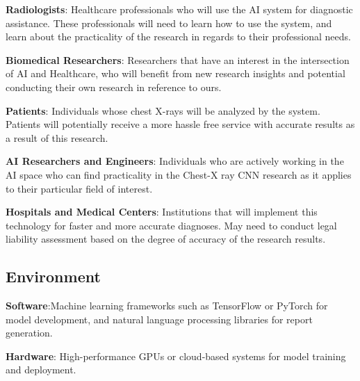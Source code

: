 \documentclass{article}
\begin{document}
\begin{itemize}
\begin{item}
    \textbf{Radiologists}: Healthcare professionals who will use the AI system for diagnostic assistance. These professionals will need to learn how to use the system, and learn about the practicality of the research in regards to their professional needs.
\end{item}
\begin{item}
    \textbf{Biomedical Researchers}: Researchers that have an interest in the intersection of AI and Healthcare, who will benefit from new research insights and potential conducting their own research in reference to ours.
\end{item}
\begin{item}
    \textbf{Patients}:  Individuals whose chest X-rays will be analyzed by the system. Patients will potentially receive a more hassle free service with accurate results as a result of this research.
\end{item}
\begin{item}
    \textbf{AI Researchers and Engineers}:  Individuals who are actively working in the AI space who can find practicality in the Chest-X ray CNN research as it applies to their particular field of interest.
\end{item}
    \begin{item}
    \textbf{Hospitals and Medical Centers}: Institutions that will implement this technology for faster and more accurate diagnoses. May need to conduct legal liability assessment based on the degree of accuracy of the research results.
\end{item}
\end{itemize}


\subsection{Environment}

\begin{itemize}
\begin{item}
\textbf{Software}:Machine learning frameworks such as TensorFlow or PyTorch for model development, and natural language processing libraries for report generation.
\end{item}
\begin{item}
\textbf{Hardware}: High-performance GPUs or cloud-based systems for model training and deployment.
\end{item}
\end{itemize}
\end{document}
